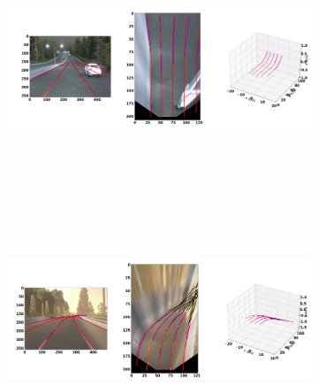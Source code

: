         \begin{figure}[h]
      \caption{Qualitative results of the trained GenLaneNet\cite{guo2020gen} trained with complex binary lane segmentation architecture on balanced scenes from sim3D\cite{guo2020gen} dataset: (a) uphill (b) downhill scenario. The ground-truth lines are color coded in red and the predicted lanes in blue. }
        \centering
        \begin{subfigure}{1\textwidth}
        \includegraphics[width=1\linewidth, height=7cm]{images/uphill_standard.png} 
        \caption{  \cite{guo2020gen}}
        \label{fig:subim1}
        \end{subfigure}
        \begin{subfigure}{1\textwidth}
        \includegraphics[width=1\linewidth,height=7cm]{images/downhill_standard.png}
        \caption{\cite{guo2020gen}}
        \label{fig:subim2}
        \end{subfigure}
        \end{figure}


